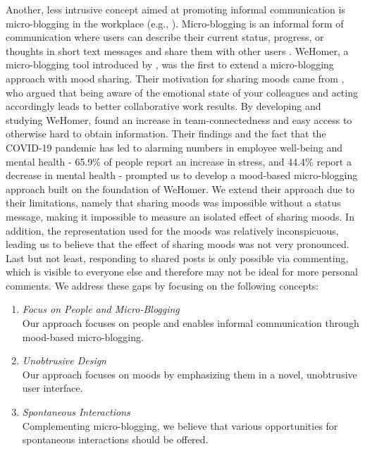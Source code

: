 Another, less intrusive concept aimed at promoting informal communication is micro-blogging in the workplace (e.g., \autocite{ebner2008microblogging, ehrlich2010microblogging, zhang2010case, dullemond2013fixing}). Micro-blogging is an informal form of communication where users can describe their current status, progress, or thoughts in short text messages and share them with other users \autocite{java2007we, dullemond2013fixing}. WeHomer, a micro-blogging tool introduced by \textcite{dullemond2013fixing}, was the first to extend a micro-blogging approach with mood sharing. Their motivation for sharing moods came from \textcite{garcia1999emotional}, who argued that being aware of the emotional state of your colleagues and acting accordingly leads to better collaborative work results. By developing and studying WeHomer, \textcite{dullemond2013fixing} found an increase in team-connectedness and easy access to otherwise hard to obtain information. Their findings and the fact that the COVID-19 pandemic has led to alarming numbers in employee well-being and mental health - 65.9\% of people report an increase in stress, and 44.4\% report a decrease in mental health \autocite{mswellbeing} - prompted us to develop a mood-based micro-blogging approach built on the foundation of WeHomer. We extend their approach due to their limitations, namely that sharing moods was impossible without a status message, making it impossible to measure an isolated effect of sharing moods. In addition, the representation used for the moods was relatively inconspicuous, leading us to believe that the effect of sharing moods was not very pronounced. Last but not least, responding to shared posts is only possible via commenting, which is visible to everyone else and therefore may not be ideal for more personal comments. We address these gaps by focusing on the following concepts:

\begin{enumerate}
    \item \textit{Focus on People and Micro-Blogging} \\
    Our approach focuses on people and enables informal communication through mood-based micro-blogging.
    \item \textit{Unobtrusive Design} \\ 
    Our approach focuses on moods by emphasizing them in a novel, unobtrusive user interface.
    \item \textit{Spontaneous Interactions} \\
    Complementing micro-blogging, we believe that various opportunities for spontaneous interactions should be offered.
\end{enumerate}

